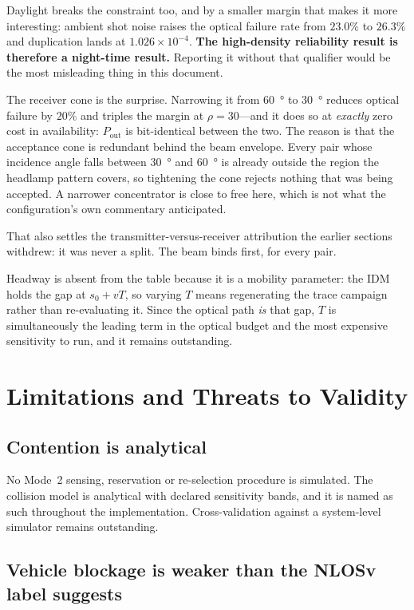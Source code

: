 \documentclass[conference]{IEEEtran}
\begin{document}
Daylight breaks the constraint too, and by a smaller margin that makes it more
interesting: ambient shot noise raises the optical failure rate from $23.0\%$
to $26.3\%$ and duplication lands at $1.026\times10^{-4}$. \textbf{The
high-density reliability result is therefore a night-time result.} Reporting it
without that qualifier would be the most misleading thing in this document.

The receiver cone is the surprise. Narrowing it from \SI{60}{\degree} to
\SI{30}{\degree} reduces optical failure by $20\%$ and triples the margin at
$\rho=30$---and it does so at \emph{exactly} zero cost in availability:
$P_{\mathrm{out}}$ is bit-identical between the two. The reason is that the
acceptance cone is redundant behind the beam envelope. Every pair whose
incidence angle falls between \SI{30}{\degree} and \SI{60}{\degree} is already
outside the region the headlamp pattern covers, so tightening the cone rejects
nothing that was being accepted. A narrower concentrator is close to free here,
which is not what the configuration's own commentary anticipated.

That also settles the transmitter-versus-receiver attribution the earlier
sections withdrew: it was never a split. The beam binds first, for every pair.

Headway is absent from the table because it is a mobility parameter: the IDM
holds the gap at $s_0 + vT$, so varying $T$ means regenerating the trace
campaign rather than re-evaluating it. Since the optical path \emph{is} that
gap, $T$ is simultaneously the leading term in the optical budget and the most
expensive sensitivity to run, and it remains outstanding.

\section{Limitations and Threats to Validity}
\label{sec:limits}

\subsection{Contention is analytical}

No Mode~2 sensing, reservation or re-selection procedure is simulated. The
collision model is analytical with declared sensitivity bands, and it is named
as such throughout the implementation. Cross-validation against a
system-level simulator remains outstanding.

\subsection{Vehicle blockage is weaker than the NLOSv label suggests}
\end{document}
